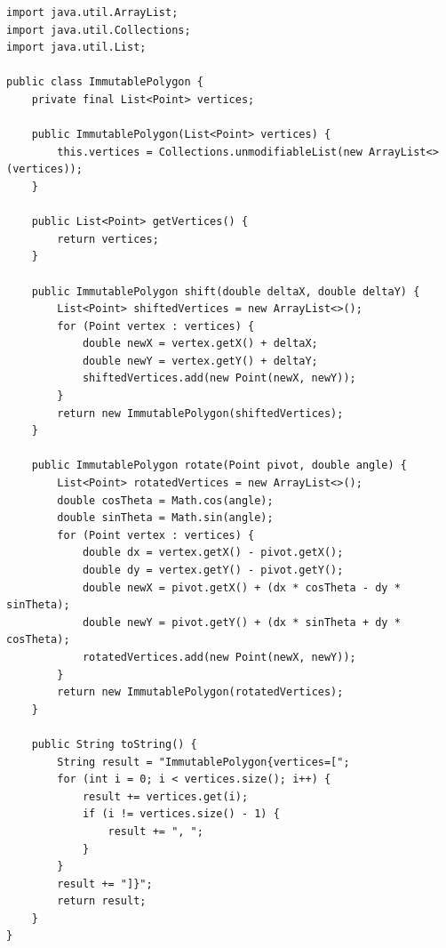 \documentclass[a4paper, 14pt]{extarticle}
\begin{document}
\begin{lstlisting}[language={},caption={класс ImmutablePolygon},label={lst:code2}]
import java.util.ArrayList;
import java.util.Collections;
import java.util.List;

public class ImmutablePolygon {
    private final List<Point> vertices;

    public ImmutablePolygon(List<Point> vertices) {
        this.vertices = Collections.unmodifiableList(new ArrayList<>(vertices));
    }

    public List<Point> getVertices() {
        return vertices;
    }

    public ImmutablePolygon shift(double deltaX, double deltaY) {
        List<Point> shiftedVertices = new ArrayList<>();
        for (Point vertex : vertices) {
            double newX = vertex.getX() + deltaX;
            double newY = vertex.getY() + deltaY;
            shiftedVertices.add(new Point(newX, newY));
        }
        return new ImmutablePolygon(shiftedVertices);
    }

    public ImmutablePolygon rotate(Point pivot, double angle) {
        List<Point> rotatedVertices = new ArrayList<>();
        double cosTheta = Math.cos(angle);
        double sinTheta = Math.sin(angle);
        for (Point vertex : vertices) {
            double dx = vertex.getX() - pivot.getX();
            double dy = vertex.getY() - pivot.getY();
            double newX = pivot.getX() + (dx * cosTheta - dy * sinTheta);
            double newY = pivot.getY() + (dx * sinTheta + dy * cosTheta);
            rotatedVertices.add(new Point(newX, newY));
        }
        return new ImmutablePolygon(rotatedVertices);
    }

    public String toString() {
        String result = "ImmutablePolygon{vertices=[";
        for (int i = 0; i < vertices.size(); i++) {
            result += vertices.get(i);
            if (i != vertices.size() - 1) {
                result += ", ";
            }
        }
        result += "]}";
        return result;
    }
}
\end{lstlisting}
\end{document}
